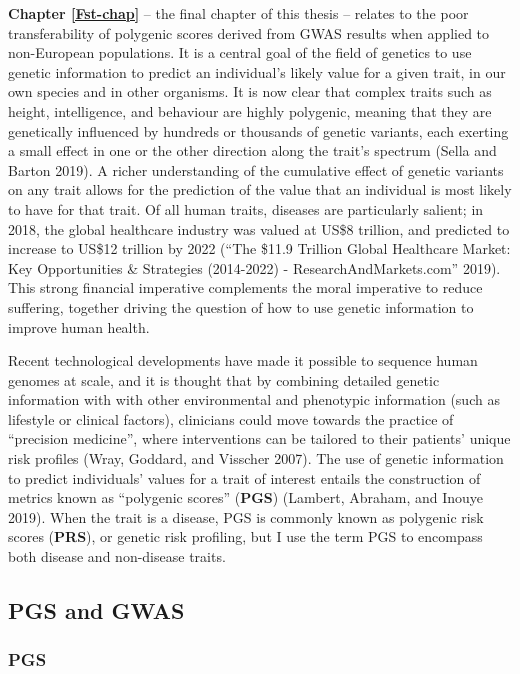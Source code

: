 \documentclass[
]{book}
\begin{document}
\textbf{Chapter \ref{Fst-chap}} -- the final chapter of this thesis -- relates to the poor transferability of polygenic scores derived from GWAS results when applied to non-European populations. It is a central goal of the field of genetics to use genetic information to predict an individual's likely value for a given trait, in our own species and in other organisms. It is now clear that complex traits such as height, intelligence, and behaviour are highly polygenic, meaning that they are genetically influenced by hundreds or thousands of genetic variants, each exerting a small effect in one or the other direction along the trait's spectrum (Sella and Barton 2019). A richer understanding of the cumulative effect of genetic variants on any trait allows for the prediction of the value that an individual is most likely to have for that trait. Of all human traits, diseases are particularly salient; in 2018, the global healthcare industry was valued at US\$8 trillion, and predicted to increase to US\$12 trillion by 2022 ({``The \$11.9 {Trillion Global Healthcare Market}: {Key Opportunities} \& {Strategies} (2014-2022) - {ResearchAndMarkets}.com''} 2019). This strong financial imperative complements the moral imperative to reduce suffering, together driving the question of how to use genetic information to improve human health.

Recent technological developments have made it possible to sequence human genomes at scale, and it is thought that by combining detailed genetic information with with other environmental and phenotypic information (such as lifestyle or clinical factors), clinicians could move towards the practice of ``precision medicine'', where interventions can be tailored to their patients' unique risk profiles (Wray, Goddard, and Visscher 2007). The use of genetic information to predict individuals' values for a trait of interest entails the construction of metrics known as ``polygenic scores'' (\textbf{PGS}) (Lambert, Abraham, and Inouye 2019). When the trait is a disease, PGS is commonly known as polygenic risk scores (\textbf{PRS}), or genetic risk profiling, but I use the term PGS to encompass both disease and non-disease traits.

\hypertarget{pgs-intro}{%
\subsection{PGS and GWAS}\label{pgs-intro}}

\hypertarget{pgs}{%
\subsubsection{PGS}\label{pgs}}
\end{document}
